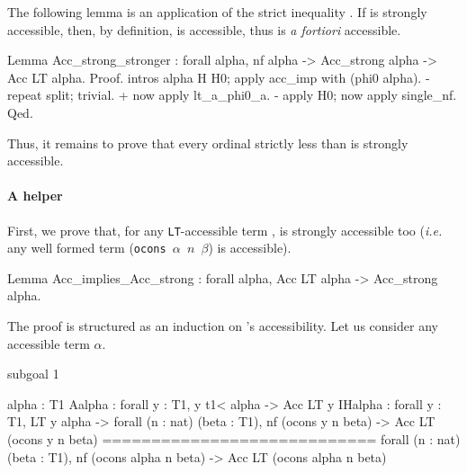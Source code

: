 The following lemma is an application of the strict inequality 
\showmath{\alpha < \omega ^\alpha}. If \showmath{\alpha} is strongly accessible, then, by definition, \showmath{\omega^\alpha} is accessible, thus \showmath{\alpha} is \emph{a fortiori} accessible.

\begin{Coqsrc}
 Lemma Acc_strong_stronger : forall alpha, 
     nf alpha -> Acc_strong  alpha -> Acc LT  alpha.
 Proof.
  intros alpha H H0; apply acc_imp with (phi0 alpha).
  - repeat split; trivial.
    + now apply lt_a_phi0_a.
  -  apply H0;  now apply single_nf.
Qed.
\end{Coqsrc}

Thus, it remains to prove that every ordinal strictly less than  
is strongly accessible.


\label{sec:orgheadline81}
\label{proof-wf-epsilon0}
\paragraph{A helper}
\label{sec:orgheadline79}

First, we prove that, for  any \texttt{LT}-accessible term \showmath{\alpha}, \showmath{\alpha} is 
strongly accessible too (\emph{i.e.} any well formed
term (\texttt{ocons $\alpha$ $n$ $\beta$})  is accessible).

\begin{Coqsrc}
Lemma Acc_implies_Acc_strong : 
   forall alpha, Acc LT  alpha -> Acc_strong alpha.
\end{Coqsrc}


The proof is structured as an induction on \showmath{\alpha}'s accessibility. Let us consider
any  accessible term $\alpha$.



\begin{Coqanswer}
  subgoal 1 

  alpha : T1
  Aalpha : forall y : T1,  y t1< alpha -> Acc LT y
  IHalpha : forall y : T1,
       LT y alpha ->
       forall (n : nat) (beta : T1),
       nf (ocons y n beta) -> Acc LT (ocons y n beta)
  ============================
   forall (n : nat) (beta : T1),
   nf (ocons alpha n beta) -> Acc LT (ocons alpha n beta)
\end{Coqanswer}

